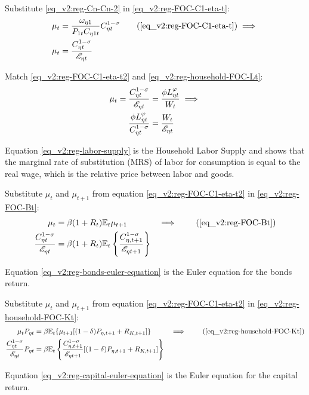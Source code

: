 \documentclass[../thesis.tex]{subfiles}
\begin{document}
Substitute \ref{eq_v2:reg-Cn-Cn-2} in \ref{eq_v2:reg-FOC-C1-eta-t}:
\begin{align}
	\mu_t &= \frac{\omega_{\eta 1}}{P_{1 t} C_{\eta 1 t}} C_{\eta t}^{1 -\sigma} \tag{\ref{eq_v2:reg-FOC-C1-eta-t}} \implies \\
	\mu_t &= \frac{ C_{\eta t}^{1-\sigma}}{ \te}  \label{eq_v2:reg-FOC-C1-eta-t2}
\end{align}

Match \ref{eq_v2:reg-FOC-C1-eta-t2} and \ref{eq_v2:reg-household-FOC-Lt}:
\begin{align}
	\mu_t = \frac{ C_{\eta t}^{1-\sigma}}{ {\mathscr{E}_{\eta t}}} &= \frac{\phi L_{\eta t}^{\varphi}}{W_t} \implies \nonumber \\
	\frac{\phi L_{\eta t}^{\varphi}}{C_{\eta t}^{1-\sigma}} &= \frac{W_t}{{\mathscr{E}_{\eta t}}} \label{eq_v2:reg-labor-supply}
\end{align}

Equation \ref{eq_v2:reg-labor-supply} is the Household Labor Supply and shows that the marginal rate of substitution (MRS) of labor for consumption is equal to the real wage, which is the relative price between labor and goods.

Substitute $\mu_t$ and $\mu_{t+1}$ from equation \ref{eq_v2:reg-FOC-C1-eta-t2} in \ref{eq_v2:reg-FOC-Bt}:
\begin{alignat}{2}
	\mu_t &= \beta (1 + R_{t}) \E{ \mu_{t+1}} &\implies \tag{\ref{eq_v2:reg-FOC-Bt}} 
	\\
	\frac{ C_{\eta t}^{1-\sigma}}{ \te} &= \beta (1 + R_{t}) \E \left\{ \frac{ C_{\eta, t+1}^{1-\sigma}}{ \te[t+1]} \right\} \label{eq_v2:reg-bonds-euler-equation}
\end{alignat}

Equation \ref{eq_v2:reg-bonds-euler-equation} is the Euler equation for the bonds return.

Substitute $\mu_t$ and $\mu_{t+1}$ from equation \ref{eq_v2:reg-FOC-C1-eta-t2} in \ref{eq_v2:reg-household-FOC-Kt}:
\begin{alignat}{2}
	\mu_t P_{\eta t} &= \beta \mathbb{E}_t \{ \mu_{t+1} [(1-\delta) P_{\eta, t+1} + R_{K,t+1}] \} &\implies \tag{\ref{eq_v2:reg-household-FOC-Kt}} 
	\\
	\frac{ C_{\eta t}^{1-\sigma}}{ \te} P_{\eta t} &= \beta \mathbb{E}_t \left\{ \frac{ C_{\eta, t+1}^{1-\sigma}}{ \te[t+1]} [(1-\delta) P_{\eta, t+1} + R_{K,t+1}] \right\} \label{eq_v2:reg-capital-euler-equation}
\end{alignat}

Equation \ref{eq_v2:reg-capital-euler-equation} is the Euler equation for the capital return.
\end{document}
